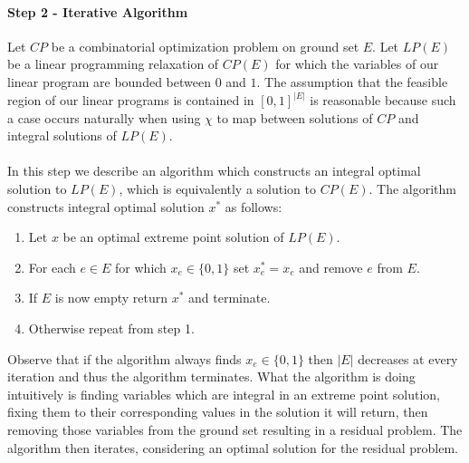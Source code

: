 \paragraph{Step 2 - Iterative Algorithm}
Let $CP$ be a combinatorial optimization problem on ground set $E$. Let $LP(E)$ be a linear programming relaxation of $CP(E)$ for which the variables of our linear program are bounded between $0$ and $1$. The assumption that the feasible region of our linear programs is contained in $[0,1]^{|E|}$ is reasonable because such a case occurs naturally when using $\chi$ to map between solutions of $CP$ and integral solutions of $LP(E)$. 
\paragraph{}
In this step we describe an algorithm which constructs an integral optimal solution to $LP(E)$, which is equivalently a solution to $CP(E)$. The algorithm constructs integral optimal solution $x^*$ as follows:
\begin{enumerate}
\item Let $x$ be an optimal extreme point solution of $LP(E)$.
\item For each $e \in E$ for which $x_e  \in \{0,1\}$ set $x^*_e = x_e$ and remove $e$ from $E$.
\item If $E$ is now empty return $x^*$ and terminate.
\item Otherwise repeat from step 1.
\end{enumerate}
Observe that if the algorithm always finds $x_e \in \{0,1\}$ then $|E|$ decreases at every iteration and thus the algorithm terminates. What the algorithm is doing intuitively is finding variables which are integral in an extreme point solution, fixing them to their corresponding values in the solution it will return, then removing those variables from the ground set resulting in a residual problem. The algorithm then iterates, considering an optimal solution for the residual problem. 
